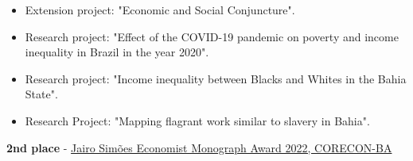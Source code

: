 






\begin{itemize}
	\item Extension project: "Economic and Social Conjuncture".
\end{itemize}

\divider

\begin{itemize}
	\item Research project: "Effect of the COVID-19 pandemic on poverty and income inequality in Brazil in the year 2020".
\end{itemize}

\divider

\begin{itemize}
	\item Research project: "Income inequality between Blacks and Whites in the Bahia State".
\end{itemize}

\divider

\begin{itemize}
	\item Research Project: "Mapping flagrant work similar to slavery in Bahia".
\end{itemize}





\divider


\divider

\cvtag{\LaTeX}




{}
{}
{}




\textbf{2nd place} - \href{http://www.corecon-ba.org.br/premio-de-monografia-economista-jairo-simoes-2022-resultado/23136/}{Jairo Simões Economist Monograph Award 2022, CORECON-BA}

